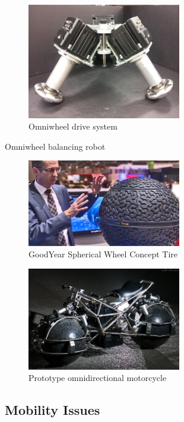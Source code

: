 \begin{figure}
\centering
\includegraphics[width=0.6\textwidth,height=\textheight]{MotionFigures/sds-omni-1.jpg}
\caption{Omniwheel drive system}
\end{figure}

Omniwheel balancing robot

\begin{figure}
\centering
\includegraphics[width=0.6\textwidth,height=\textheight]{MotionFigures/goodyearsphere.jpg}
\caption{GoodYear Spherical Wheel Concept Tire}
\end{figure}

\begin{figure}
\centering
\includegraphics[width=0.6\textwidth,height=\textheight]{MotionFigures/SDS-omnidirectional-electric-motorcycle4.jpg}
\caption{Prototype omnidirectional motorcycle}
\end{figure}

\hypertarget{mobility-issues}{%
\subsection{Mobility Issues}\label{mobility-issues}}


